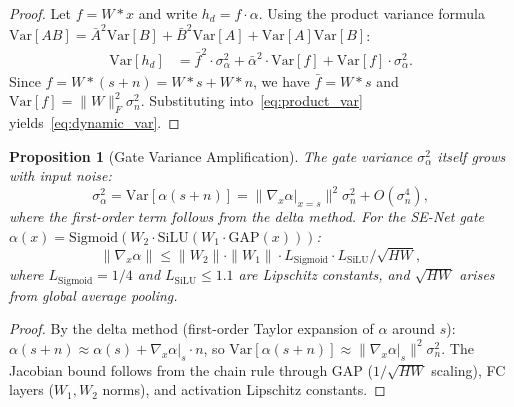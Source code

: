 \documentclass[journal]{IEEEtran}
\newtheorem{proposition}{Proposition}
\begin{document}
\begin{proof}
Let $f = W * x$ and write $h_d = f \cdot \alpha$.
Using the product variance formula $\text{Var}[AB] = \bar{A}^2\text{Var}[B] + \bar{B}^2\text{Var}[A] + \text{Var}[A]\text{Var}[B]$:
\begin{align}
\text{Var}[h_d] &= \bar{f}^2 \cdot \sigma_\alpha^2 + \bar{\alpha}^2 \cdot \text{Var}[f] + \text{Var}[f] \cdot \sigma_\alpha^2.
\label{eq:product_var}
\end{align}
Since $f = W * (s + n) = W*s + W*n$, we have $\bar{f} = W*s$ and $\text{Var}[f] = \|W\|_F^2 \sigma_n^2$.
Substituting into~\eqref{eq:product_var} yields~\eqref{eq:dynamic_var}.
\end{proof}

\begin{proposition}[Gate Variance Amplification]
\label{prop:gate_var}
The gate variance $\sigma_\alpha^2$ itself grows with input noise:
\begin{equation}
\sigma_\alpha^2 = \text{Var}[\alpha(s+n)] = \|\nabla_x \alpha|_{x=s}\|^2 \sigma_n^2 + O(\sigma_n^4),
\label{eq:gate_var}
\end{equation}
where the first-order term follows from the delta method.
For the SE-Net gate $\alpha(x) = \text{Sigmoid}(W_2 \cdot \text{SiLU}(W_1 \cdot \text{GAP}(x)))$:
\begin{equation}
\|\nabla_x \alpha\| \leq \|W_2\| \cdot \|W_1\| \cdot L_{\text{Sigmoid}} \cdot L_{\text{SiLU}} / \sqrt{HW},
\end{equation}
where $L_{\text{Sigmoid}} = 1/4$ and $L_{\text{SiLU}} \leq 1.1$ are Lipschitz constants, and $\sqrt{HW}$ arises from global average pooling.
\end{proposition}

\begin{proof}
By the delta method (first-order Taylor expansion of $\alpha$ around $s$):
$\alpha(s+n) \approx \alpha(s) + \nabla_x \alpha|_s \cdot n$,
so $\text{Var}[\alpha(s+n)] \approx \|\nabla_x \alpha|_s\|^2 \sigma_n^2$.
The Jacobian bound follows from the chain rule through GAP ($1/\sqrt{HW}$ scaling), FC layers ($W_1, W_2$ norms), and activation Lipschitz constants.
\end{proof}
\end{document}
